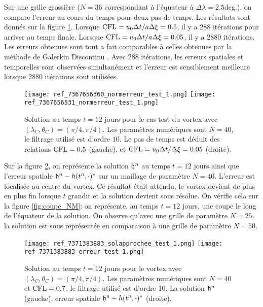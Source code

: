 Sur une grille grossière ($N=36$ correspondant à l'équateur à $\Delta \lambda = 2.5$deg.), on compare l'erreur au cours du temps pour deux pas de temps. Les résultats sont donnés sur la figure \ref{fig:cfl_NM}. Lorsque $\text{CFL} = u_0 \Delta t / a \Delta \xi = 0.5$, il y a 288 itérations pour arriver au temps finale. Lorsque $\text{CFL} = u_0 \Delta t / a \Delta \xi = 0.05$, il y a 2880 itérations. Les erreurs obtenues sont tout a fait comparables à celles obtenues par la méthode de Galerkin Discontinu \cite{Nair2008}. Avec 288 itérations, les erreurs spatiales et temporelles sont observées simultanément et l'erreur est sensiblement meilleure lorsque 2880 itérations sont utilisées.

\begin{figure}[htbp]
\begin{center}
\texttt{[image: ref\_7367656360\_normerreur\_test\_1.png]}
\texttt{[image: ref\_7367656531\_normerreur\_test\_1.png]}
\end{center}
\caption{Solution au temps $t=12$ jours pour le cas test du vortex \cite{Nair2002} avec $(\lambda_C, \theta_C) = (\pi/4, \pi/4)$. Les paramètres numériques sont $N=40$, le filtrage utilisé est d'ordre $10$. Le pas de temps est déduit des relations $\text{CFL} = 0.5$ (gauche), et $\text{CFL} = u_0 \Delta t / \Delta \xi = 0.05$ (droite).}
\label{fig:cfl_NM}
\end{figure}

Sur la figure \ref{fig:space_NM}, on représente la solution $\mathfrak{h}^n$ au temps $t=12$ jours ainsi que l'erreur spatiale $\mathfrak{h}^n-h(t^n,\cdot)^*$ sur un maillage de paramètre $N=40$. L'erreur est localisée au centre du vortex. Ce résultat était attendu, le vortex devient de plus en plus fin lorsque $t$ grandit et la solution devient sous résolue. 
On vérifie cela sur la figure \ref{fig:coupe_NM}: on représente, au temps $t=12$ jours, une coupe le long de l'équateur de la solution. On observe qu'avec une grille de paramètre $N=25$, la solution est sous représentée en comparaison à une grille de paramètre $N=50$.

\begin{figure}[htbp]
\begin{center}
\texttt{[image: ref\_7371383883\_solapprochee\_test\_1.png]}
\texttt{[image: ref\_7371383883\_erreur\_test\_1.png]}
\end{center}
\caption{Solution au temps $t=12$ jours pour le vortex \cite{Nair2002} avec $(\lambda_C, \theta_C) = (\pi/4, \pi/4)$. Les paramètres numériques sont $N=40$ et $\text{CFL} = 0.7$, le filtrage utilisé est d'ordre $10$. La solution $\mathfrak{h}^n$ (gauche), erreur spatiale $\mathfrak{h}^n - h(t^n,\cdot)^*$ (droite).}
\label{fig:space_NM}
\end{figure}

